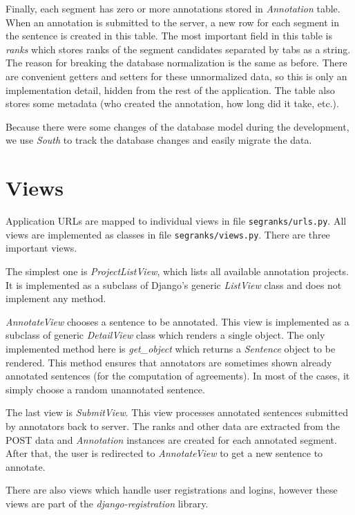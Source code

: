 Finally, each segment has zero or more annotations stored in
\textit{Annotation} table. When an annotation is submitted to the server, a new
row for each segment in the sentence is created in this table. The most
important field in this table is \textit{ranks} which stores ranks of the
segment candidates separated by tabs as a string. The reason for breaking the
database normalization is the same as before. There are convenient getters and
setters for these unnormalized data, so this is only an implementation detail,
hidden from the rest of the application. The table also stores some metadata
(who created the annotation, how long did it take, etc.).

Because there were some changes of the database model during the development,
we use \textit{South} to track the database changes and easily migrate the
data.


\section{Views}

Application URLs are mapped to individual views in file
\texttt{segranks/urls.py}. All views are implemented as classes in file
\texttt{segranks/views.py}. There are three important views.

The simplest one is \textit{ProjectListView}, which lists all available
annotation projects. It is implemented as a subclass of Django's generic
\textit{ListView} class and does not implement any method.

\textit{AnnotateView} chooses a sentence to be annotated. This view is
implemented as a subclass of generic \textit{DetailView} class which renders a
single object. The only implemented method here is \textit{get\_object} which
returns a \textit{Sentence} object to be rendered. This method ensures that
annotators are sometimes shown already annotated sentences (for the computation
of agreements). In most of the cases, it simply choose a random unannotated
sentence.

The last view is \textit{SubmitView}. This view processes annotated sentences
submitted by annotators back to server. The ranks and other data are extracted
from the POST data and \textit{Annotation} instances are created for each
annotated segment. After that, the user is redirected to \textit{AnnotateView}
to get a new sentence to annotate.

There are also views which handle user registrations and logins, however these
views are part of the \textit{django-registration} library.

